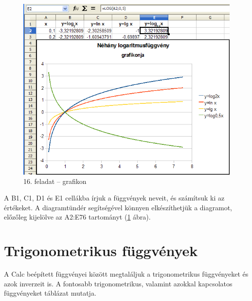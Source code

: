 \begin{figure}[!h]
\begin{center}
\includegraphics[width=14.739cm]{oocalcv2-img88.png}
\caption{16. feladat --  grafikon}\label{16-feladatGrafikon}
\end{center}
\end{figure}

A B1, C1, D1 és E1 cellákba írjuk a függvények neveit, és
számítsuk ki az értékeket. A diagramtündér
segítségével könnyen elkészíthetjük a diagramot,
 előzőleg kijelölve az A2:E76 tartományt (\ref{16-feladatGrafikon} ábra).

\section{Trigonometrikus függvények}

A Calc beépített függvényei között megtaláljuk a
trigonometrikus függvényeket és azok inverzeit is. A fontosabb
trigonometrikus, valamint azokkal kapcsolatos függvényeket
 táblázat mutatja.

